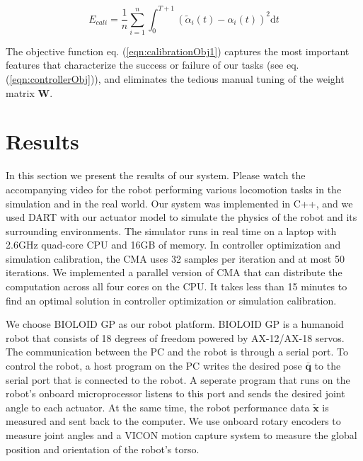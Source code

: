 \begin{equation}
  E_{cali}=\frac{1}{n}\sum_{i=1}^{n}\int_{0}^{T+1}(\tilde{\alpha}_i(t)-\alpha_i(t))^2\mathrm{d}t
  \label{eqn:calibrationObj1}
\end{equation}

The objective function eq. (\ref{eqn:calibrationObj1}) captures the most important features that characterize the success or failure of our tasks (see eq.(\ref{eqn:controllerObj})), and eliminates the tedious manual tuning of the weight matrix $\mathbf{W}$.

\section{Results}
In this section we present the results of our system. Please watch the accompanying video for the robot performing various locomotion tasks in the simulation and in the real world. Our system was implemented in C++, and we used DART with our actuator model to simulate the physics of the robot and its surrounding environments. The simulator runs in real time on a laptop with 2.6GHz quad-core CPU and 16GB of memory. In controller optimization and simulation calibration, the CMA uses 32 samples per iteration and at most 50 iterations. We implemented a parallel version of CMA that can distribute the computation across all four cores on the CPU. It takes less than 15 minutes to find an optimal solution in controller optimization or simulation calibration.

We choose BIOLOID GP as our robot platform. BIOLOID GP is a humanoid robot that consists of 18 degrees of freedom powered by AX-12/AX-18 servos. The communication between the PC and the robot is through a serial port. To control the robot, a host program on the PC writes the desired pose $\bar{\mathbf{q}}$ to the serial port that is connected to the robot. A seperate program that runs on the robot's onboard microprocessor listens to this port and sends the desired joint angle to each actuator. At the same time, the robot performance data $\tilde{\mathbf{x}}$ is measured and sent back to the computer. We use onboard rotary encoders to measure joint angles and a VICON motion capture system to measure the global position and orientation of the robot's torso.

